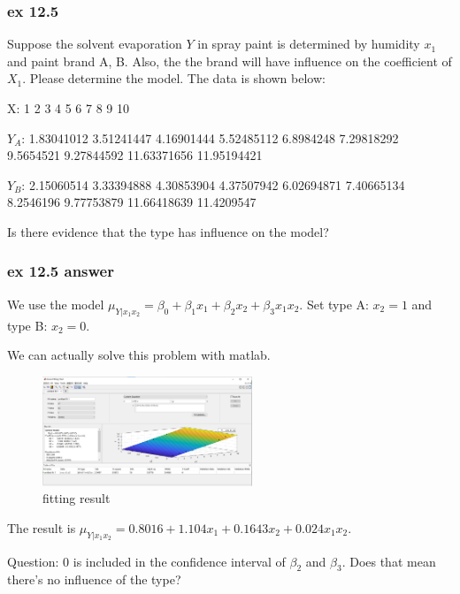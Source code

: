 \documentclass{beamer}
\begin{document}
\begin{frame}
    \frametitle{ex 12.5}

    Suppose the solvent evaporation $Y$ in spray paint is determined by humidity $x_1$ and paint brand A, B. Also, the the brand will have influence on the coefficient of $X_1$. Please determine the model. The data is shown below:\par
    X: 1  2  3  4  5  6  7  8  9 10\par
    $Y_A$: 1.83041012  3.51241447  4.16901444  5.52485112  6.8984248   7.29818292
    9.5654521   9.27844592 11.63371656 11.95194421\par
    $Y_B$: 2.15060514  3.33394888  4.30853904  4.37507942  6.02694871  7.40665134
    8.2546196   9.77753879 11.66418639 11.4209547\par
    Is there evidence that the type has influence on the model?

\end{frame}

\begin{frame}
    \frametitle{ex 12.5 answer}

    We use the model $\mu_{Y|x_1 x_2}=\beta_0+\beta_1 x_1+\beta_2 x_2 +\beta_3 x_1 x_2$. Set type A: $x_2=1$ and type B: $x_2=0$.\par
    We can actually solve this problem with matlab.
    \begin{figure}[H]
        \centering
        \includegraphics[width=0.56\textwidth,height=0.28\textwidth]{ex12_5.jpg}
        \caption{fitting result}
    \end{figure}\par
    The result is $\mu_{Y|x_1 x_2}=0.8016+1.104 x_1+0.1643 x_2 +0.024 x_1 x_2$.\par
    Question: 0 is included in the confidence interval of $\beta_2$ and $\beta_3$. Does that mean there's no influence of the type?
\end{frame}
\end{document}
